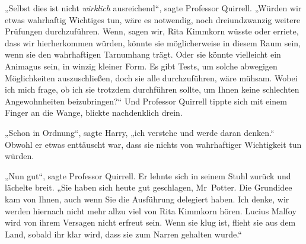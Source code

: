 „Selbst dies ist nicht \emph{wirklich} ausreichend“, sagte Professor Quirrell.
„Würden wir etwas wahrhaftig Wichtiges tun, wäre es notwendig, noch dreiundzwanzig weitere Prüfungen durchzuführen. Wenn, sagen wir, Rita Kimmkorn wüsste oder erriete, dass wir hierherkommen würden, könnte sie möglicherweise in diesem Raum sein, wenn sie den wahrhaftigen Tarnumhang trägt. Oder sie könnte vielleicht ein Animagus sein, in winzig kleiner Form. Es gibt Tests, um solche abwegigen Möglichkeiten auszuschließen, doch sie alle durchzuführen, wäre mühsam. Wobei ich mich frage, ob ich sie trotzdem durchführen sollte, um Ihnen keine schlechten Angewohnheiten beizubringen?“ Und Professor Quirrell tippte sich mit einem Finger an die Wange, blickte nachdenklich drein.

„Schon in Ordnung“, sagte Harry, „ich verstehe und werde daran denken.“ Obwohl er etwas enttäuscht war, dass sie nichts von wahrhaftiger Wichtigkeit tun würden.

„Nun gut“, sagte Professor Quirrell. Er lehnte sich in seinem Stuhl zurück und lächelte breit.
„Sie haben sich heute gut geschlagen, Mr~Potter. Die Grundidee kam von Ihnen, auch wenn Sie die Ausführung delegiert haben. Ich denke, wir werden hiernach nicht mehr allzu viel von Rita Kimmkorn hören. Lucius Malfoy wird von ihrem Versagen nicht erfreut sein. Wenn sie klug ist, flieht sie aus dem Land, sobald ihr klar wird, dass sie zum Narren gehalten wurde.“

